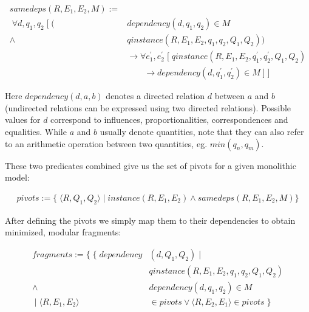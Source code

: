 \documentclass{article} %
\begin{document}
\begin{align*}
samedeps(R, E_1, E_2, M) := \\
	\; \forall d, q_1, q_2 \; [ \; 
	(&dependency(d, q_1, q_2) \in M \\
	\land \; &qinstance(R, E_1, E_2, q_1, q_2, Q_1, Q_2)) \\
	& 	\rightarrow \forall e^\prime_1, e^\prime_2 \; [ \;
	 qinstance(R, E_1, E_2, q^\prime_1, q^\prime_2, Q_1, Q_2) \\
	& \qquad \rightarrow dependency(d, q^\prime_1, q^\prime_2) \in M \; ] \; ]
\end{align*}

Here $dependency(d, a, b)$ denotes a directed relation $d$ between $a$
and $b$ (undirected relations can be expressed using two directed relations).
Possible values for $d$ correspond to influences, proportionalities,
correspondences and equalities. While $a$ and $b$ usually denote quantities,
note that they can also refer to an arithmetic operation between two
quantities, eg. $min(q_n, q_m)$.

These two predicates combined give us the set of pivots for a given
monolithic model:

\begin{align*}
pivots := \{ \; \langle R, Q_1, Q_2 \rangle \; | 
	\; instance(R, E_1, E_2) 
	\land samedeps(R, E_1, E_2, M) \} 
\end{align*}

After defining the pivots we simply map them to their dependencies to obtain
minimized, modular fragments:

\begin{align*}
fragments := \{ \; \{ \; dependency&(d, Q_1, Q_2) \; | \; \\
		& qinstance(R, E_1, E_2, q_1, q_2, Q_1, Q_2) \\
		\land \; & dependency(d, q_1, q_2)  \in M \\
	\; | \; \langle R, E_1, E_2 \rangle &\in pivots \lor 
	\langle R, E_2, E_1 \rangle \in pivots \; \}
\end{align*}
\end{document}
